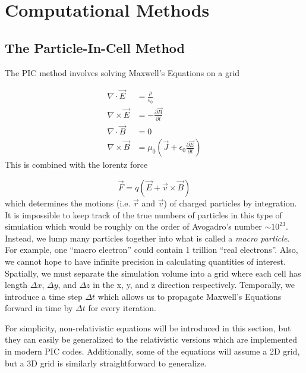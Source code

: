 \chapter{Computational Methods} \label{ch:3}

\section{The Particle-In-Cell Method}

The \gls{PIC} method involves solving Maxwell's Equations on a grid 

\begin{align}
	\nabla \cdot \vec{E} &= \frac{\rho}{\epsilon_0}  \label{eq:gauss} \\
	\nabla \times \vec{E} &= - \frac{\partial \vec{B}}{\partial t} \label{eq:faraday} \\
	\nabla \cdot \vec{B} &= 0 \label{eq:gauss_magnetism} \\
	\nabla \times \vec{B} &= \mu_0 (\vec{J} + \epsilon_0 \frac{\partial \vec{E}}{\partial t}) \label{eq:ampere}
\end{align}
This is combined with the lorentz force

\begin{equation}
	\vec{F} = q(\vec{E} + \vec{v} \times \vec{B}) \label{eq:lorentz_pic}
\end{equation}
which determines the motions (i.e. $\vec{r}$ and $\vec{v}$) of charged particles by integration. It is impossible to keep track of the true numbers of particles in this type of simulation which would be roughly on the order of Avogadro's number $\sim 10^{23}$. Instead, we lump many particles together into what is called a \emph{macro particle}. For example, one ``macro electron'' could contain 1 trillion ``real electrons''. Also, we cannot hope to have infinite precision in calculating quantities of interest. Spatially, we must separate the simulation volume into a grid where each cell has length $\Delta x$, $\Delta y$, and $\Delta z$ in the x, y, and z direction respectively. Temporally, we introduce a time step $\Delta t$ which allows us to propagate Maxwell's Equations forward in time by $\Delta t$ for every iteration.

For simplicity, non-relativistic equations will be introduced in this section, but they can easily be generalized to the relativistic versions which are implemented in modern PIC codes. Additionally, some of the equations will assume a 2D grid, but a 3D grid is similarly straightforward to generalize.

